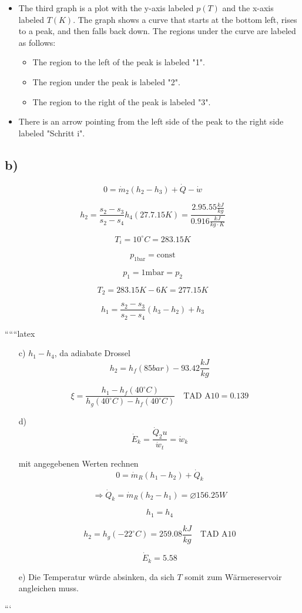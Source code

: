 \begin{itemize}
    \item The third graph is a plot with the y-axis labeled \( p(T) \) and the x-axis labeled \( T(K) \). The graph shows a curve that starts at the bottom left, rises to a peak, and then falls back down. The regions under the curve are labeled as follows:
        \begin{itemize}
            \item The region to the left of the peak is labeled "1".
            \item The region under the peak is labeled "2".
            \item The region to the right of the peak is labeled "3".
        \end{itemize}
    \item There is an arrow pointing from the left side of the peak to the right side labeled "Schritt i".
\end{itemize}

\subsection*{b)}

\[
0 = \dot{m}_2 (h_2 - h_3) + \dot{Q} - \dot{w}
\]

\[
h_2 = \frac{s_2 - s_3}{s_2 - s_4} h_4 (27.7.15 K) = \frac{2.95.55 \frac{kJ}{kg}}{0.916 \frac{kJ}{kg \cdot K}}
\]

\[
T_i = 10^\circ C = 283.15 K
\]

\[
p_{\text{1bar}} = \text{const}
\]

\[
p_1 = 1 \text{mbar} = p_2
\]

\[
T_2 = 283.15 K - 6 K = 277.15 K
\]

\[
h_1 = \frac{s_2 - s_3}{s_2 - s_4} (h_3 - h_2) + h_3
\]

``````latex


\begin{itemize}
    \item[c)] \( h_1 - h_4 \), da adiabate Drossel \\
    \[ h_2 = h_f (85 bar) - 93.42 \frac{kJ}{kg} \]
    
    \[
    \xi = \frac{h_1 - h_f (40^\circ C)}{h_g (40^\circ C) - h_f (40^\circ C)} \quad \text{TAD A10} = 0.139
    \]
    
    \item[d)] \[ \dot{E}_k = \frac{\dot{Q}_2 u}{\dot{w}_t} = \dot{w}_k \]
    
    mit angegebenen Werten rechnen \\
    \[ 0 = \dot{m}_R (h_1 - h_2) + \dot{Q}_k \]
    
    \[
    \Rightarrow \dot{Q}_k = \dot{m}_R (h_2 - h_1) = \diameter 156.25 W
    \]
    
    \[
    h_1 = h_4
    \]
    
    \[
    h_2 = h_g (-22^\circ C) = 259.08 \frac{kJ}{kg} \quad \text{TAD A10}
    \]
    
    \[
    \dot{E}_k = 5.58
    \]
    
    \item[e)] Die Temperatur würde absinken, da sich $T$ somit zum Wärmereservoir angleichen muss.
\end{itemize}

```